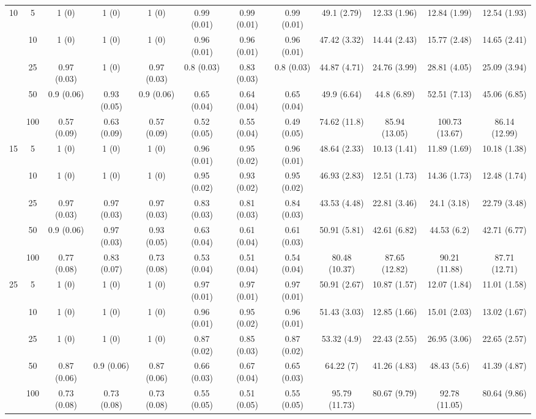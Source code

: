 \documentclass[11pt]{article}
\theoremstyle{definition}
\begin{document}
\begin{table}[H]
\begin{center}
{\begin{tabular}{cc|ccc|ccc|cccc|}
   \multirow{5}{*}{10}  & 5  & 1 (0) & 1 (0) & 1 (0) & 0.99 (0.01) & 0.99 (0.01) & 0.99 (0.01) & 49.1 (2.79) & 12.33 (1.96) & 12.84 (1.99) & 12.54 (1.93) \\ 
   & 10  & 1 (0) & 1 (0) & 1 (0) & 0.96 (0.01) & 0.96 (0.01) & 0.96 (0.01) & 47.42 (3.32) & 14.44 (2.43) & 15.77 (2.48) & 14.65 (2.41) \\ 
    & 25  & 0.97 (0.03) & 1 (0) & 0.97 (0.03) & 0.8 (0.03) & 0.83 (0.03) & 0.8 (0.03) & 44.87 (4.71) & 24.76 (3.99) & 28.81 (4.05) & 25.09 (3.94) \\ 
    & 50  & 0.9 (0.06) & 0.93 (0.05) & 0.9 (0.06) & 0.65 (0.04) & 0.64 (0.04) & 0.65 (0.04) & 49.9 (6.64) & 44.8 (6.89) & 52.51 (7.13) & 45.06 (6.85) \\ 
    & 100  & 0.57 (0.09) & 0.63 (0.09) & 0.57 (0.09) & 0.52 (0.05) & 0.55 (0.04) & 0.49 (0.05) & 74.62 (11.8) & 85.94 (13.05) & 100.73 (13.67) & 86.14 (12.99) \\[.3cm] 
   \multirow{5}{*}{15} & 5  & 1 (0) & 1 (0) & 1 (0) & 0.96 (0.01) & 0.95 (0.02) & 0.96 (0.01) & 48.64 (2.33) & 10.13 (1.41) & 11.89 (1.69) & 10.18 (1.38) \\ 
    & 10  & 1 (0) & 1 (0) & 1 (0) & 0.95 (0.02) & 0.93 (0.02) & 0.95 (0.02) & 46.93 (2.83) & 12.51 (1.73) & 14.36 (1.73) & 12.48 (1.74) \\ 
    & 25  & 0.97 (0.03) & 0.97 (0.03) & 0.97 (0.03) & 0.83 (0.03) & 0.81 (0.03) & 0.84 (0.03) & 43.53 (4.48) & 22.81 (3.46) & 24.1 (3.18) & 22.79 (3.48) \\ 
    & 50  & 0.9 (0.06) & 0.97 (0.03) & 0.93 (0.05) & 0.63 (0.04) & 0.61 (0.04) & 0.61 (0.03) & 50.91 (5.81) & 42.61 (6.82) & 44.53 (6.2) & 42.71 (6.77) \\ 
    & 100  & 0.77 (0.08) & 0.83 (0.07) & 0.73 (0.08) & 0.53 (0.04) & 0.51 (0.04) & 0.54 (0.04) & 80.48 (10.37) & 87.65 (12.82) & 90.21 (11.88) & 87.71 (12.71) \\[.3cm] 
   \multirow{5}{*}{25} & 5  & 1 (0) & 1 (0) & 1 (0) & 0.97 (0.01) & 0.97 (0.01) & 0.97 (0.01) & 50.91 (2.67) & 10.87 (1.57) & 12.07 (1.84) & 11.01 (1.58) \\ 
    & 10  & 1 (0) & 1 (0) & 1 (0) & 0.96 (0.01) & 0.95 (0.02) & 0.96 (0.01) & 51.43 (3.03) & 12.85 (1.66) & 15.01 (2.03) & 13.02 (1.67) \\ 
    & 25  & 1 (0) & 1 (0) & 1 (0) & 0.87 (0.02) & 0.85 (0.03) & 0.87 (0.02) & 53.32 (4.9) & 22.43 (2.55) & 26.95 (3.06) & 22.65 (2.57) \\ 
    & 50  & 0.87 (0.06) & 0.9 (0.06) & 0.87 (0.06) & 0.66 (0.03) & 0.67 (0.04) & 0.65 (0.03) & 64.22 (7) & 41.26 (4.83) & 48.43 (5.6) & 41.39 (4.87) \\ 
    & 100  & 0.73 (0.08) & 0.73 (0.08) & 0.73 (0.08) & 0.55 (0.05) & 0.51 (0.05) & 0.55 (0.05) & 95.79 (11.73) & 80.67 (9.79) & 92.78 (11.05) & 80.64 (9.86) \\
\end{tabular}}
   \end{center}
      \vspace{-.5cm}
\end{table}
\end{document}
